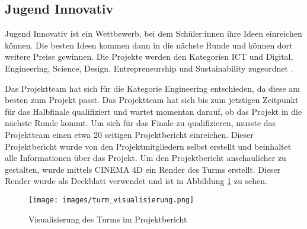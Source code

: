 \subsection{Jugend Innovativ}


Jugend Innovativ ist ein Wettbewerb, bei dem Schüler:innen ihre Ideen einreichen können. Die besten Ideen kommen dann in die nächste Runde und können dort weitere Preise gewinnen. Die Projekte werden den Kategorien ICT und Digital, Engineering, Science, Design, Entrepreneurship und Sustainability zugeordnet .

Das Projektteam hat sich für die Kategorie Engineering entschieden, da diese am besten zum Projekt passt. Das Projektteam hat sich bis zum jetztigen Zeitpunkt für das Halbfinale qualifiziert und wartet momentan darauf, ob das Projekt in die nächste Runde kommt. Um sich für das Finale zu qualifizieren, musste das Projektteam einen etwa 20 seitigen Projektbericht einreichen. Dieser Projektbericht wurde von den Projektmitgliedern selbst erstellt und beinhaltet alle Informationen über das Projekt. Um den Projektbericht anschaulicher zu gestalten, wurde mittels CINEMA 4D ein Render des Turms erstellt. Dieser Render wurde als Deckblatt verwendet und ist in Abbildung \ref{fig:turm_visualisierung} zu sehen.

\begin{figure}[H]
    \centering
    \texttt{[image: images/turm\_visualisierung.png]}
    \caption{Visualisierung des Turms im Projektbericht}
    \label{fig:turm_visualisierung}
\end{figure}